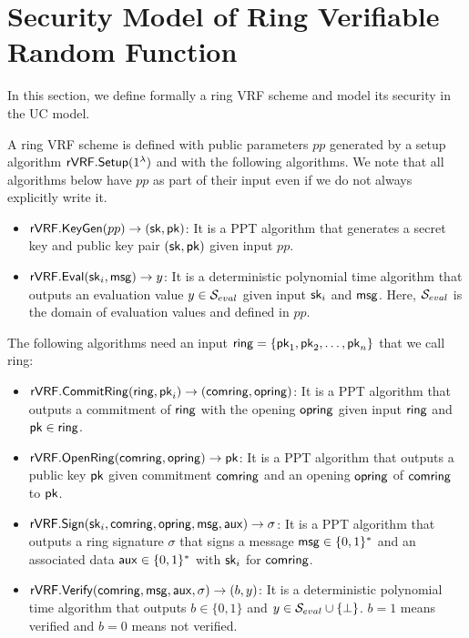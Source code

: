\newcommand{\Gen}{\ensuremath{\mathsf{Gen}}}

\newcommand{\anonymouskeymap}{\ensuremath{\mathtt{anonymous\_key\_map}}}
\newcommand{\anonymouskeylist}{\mathcal{W}}
\renewcommand{\sim}{\simulator}


\section{Security Model  of Ring Verifiable Random Function}

In this section, we define formally a ring VRF scheme and model its security in the UC model.

\begin{definition} \label{def:ringVRF}	A ring VRF scheme is defined with public parameters $ pp $ generated by a setup algorithm $ {\mathsf{rVRF}}.{\mathsf{Setup}}(1^\lambda) $ and with the following  algorithms. 	We note that  all algorithms below have $ pp $ as part of their input even if we do not always explicitly write it.
	
	\begin{itemize}
		\item $ {\mathsf{rVRF}}.{\mathsf{KeyGen}}(pp) \rightarrow (\mathsf{sk},\mathsf{pk})$: It is a PPT algorithm that generates a secret key and public key pair $ (\mathsf{sk},\mathsf{pk}) $ given input $ pp $.
		\item $ {\mathsf{rVRF}}.{\mathsf{Eval}}(\mathsf{sk}_i, \mathsf{msg}) \rightarrow y$: It is a deterministic polynomial time algorithm that outputs an evaluation value $ y \in {\ensuremath{\mathcal{S}}}_{eval}$ given input $ \mathsf{sk}_i $ and $ \mathsf{msg} $. Here, $ {\mathcal{S}}_{eval} $ is the domain  of  evaluation values and defined in $ pp $.
	\end{itemize}
	The following algorithms need an input $ \mathsf{ring} = \{ \mathsf{pk}_1, \mathsf{pk}_2, \ldots, \mathsf{pk}_n \}$ that we call ring:
	\begin{itemize}
		\item $ {\mathsf{rVRF}}.{\mathsf{CommitRing}}(\mathsf{ring}, \mathsf{pk}_i)  \rightarrow (\mathsf{comring}, \mathsf{opring})$: It is a PPT algorithm that outputs a commitment of $ \mathsf{ring} $ with the opening $ \mathsf{opring} $ given input  $ \mathsf{ring} $ and $ \mathsf{pk} \in \mathsf{ring} $.
		\item $ {\mathsf{rVRF}}.{\mathsf{OpenRing}}(\mathsf{comring},\mathsf{opring}) \rightarrow \mathsf{pk} $: It is a PPT algorithm that outputs a public key $ \mathsf{pk}  $ given commitment $ \mathsf{comring} $ and an opening $ \mathsf{opring} $ of $\mathsf{comring}$ to $\mathsf{pk}$.
		\item $ {\mathsf{rVRF}}.{\mathsf{Sign}}(\mathsf{sk}_i, \mathsf{comring},\mathsf{opring}, \mathsf{msg}, \mathsf{aux})\rightarrow \sigma$: It is a PPT algorithm that outputs a ring signature  $\sigma $  that signs a message $ \mathsf{msg} \in \{0,1\}^* $ and an associated data $ \mathsf{aux} \in \{0,1\}^*$ with $ \mathsf{sk}_i$ for $ \mathsf{comring} $.
		\item $ {\mathsf{rVRF}}.{\mathsf{Verify}}(\mathsf{comring},\mathsf{msg},\mathsf{aux},\sigma) \rightarrow  (b, y)$: It is a deterministic polynomial time algorithm that outputs  $ b \in \{0,1\} $ and $ y \in{\ensuremath{\mathcal{S}}}_{eval}\cup \{\perp\} $. $ b =1 $ means verified and $ b = 0 $ means not verified.
	\end{itemize}
	
\end{definition}


